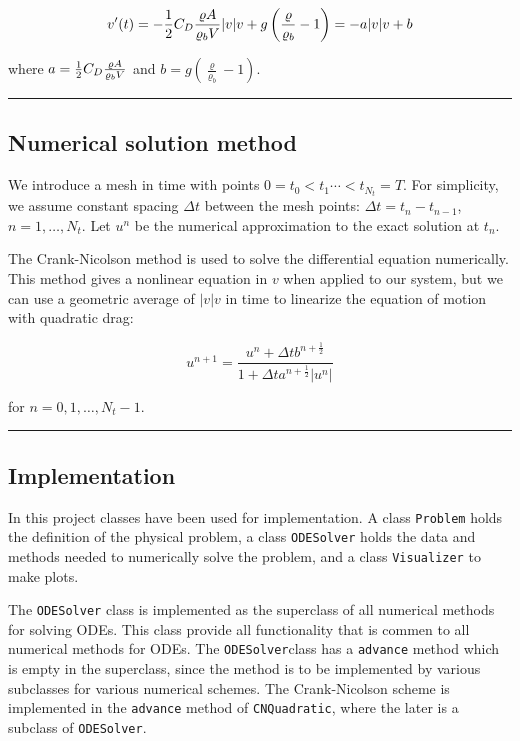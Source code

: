 \documentclass[letterpaper,10pt,english]{/usr/share/sphinx/texinputs/sphinxhowto}
\begin{document}
\[ v'(t) = -{1\over2}C_D{\varrho A\over\varrho_b V}\vert v\vert v + g\left({\varrho\over\varrho_b} - 1\right)
= -a \vert v\vert v+b\]

where $a = {1\over2}C_D{\varrho A\over\varrho_b V}$ and
$b = g\left(\frac{\varrho}{\varrho_b} -1\right)$.\begin{center}\rule{3in}{0.4pt}\end{center}

\subsection{Numerical solution method}

We introduce a mesh in time with points
$0= t_0< t_1 \cdots < t_{N_t}=T$. For simplicity, we assume constant
spacing $\Delta t$ between the mesh points: $\Delta t = t_{n}-t_{n-1}$,
$n=1,\ldots,N_t$. Let $u^n$ be the numerical approximation to the exact
solution at $t_n$.

The Crank-Nicolson method is used to solve the differential equation
numerically. This method gives a nonlinear equation in $v$ when applied
to our system, but we can use a geometric average of $\vert v\vert v$ in
time to linearize the equation of motion with quadratic drag:

\[ u^{n+1} = \frac{u^n + \Delta t b^{n+\frac{1}{2}}}{1 + \Delta t a^{n+\frac{1}{2}}\vert u^{n}\vert }\]

for $n=0,1,\ldots,N_t-1$.\begin{center}\rule{3in}{0.4pt}\end{center}

\subsection{Implementation}

In this project classes have been used for implementation. A class
\texttt{Problem} holds the definition of the physical problem, a class
\texttt{ODESolver} holds the data and methods needed to numerically
solve the problem, and a class \texttt{Visualizer} to make plots.

The \texttt{ODESolver} class is implemented as the superclass of all
numerical methods for solving ODEs. This class provide all functionality
that is commen to all numerical methods for ODEs. The
\texttt{ODESolver}class has a \texttt{advance} method which is empty in
the superclass, since the method is to be implemented by various
subclasses for various numerical schemes. The Crank-Nicolson scheme is
implemented in the \texttt{advance} method of \texttt{CNQuadratic},
where the later is a subclass of \texttt{ODESolver}.
\end{document}
